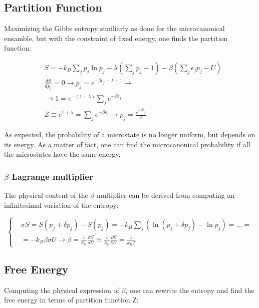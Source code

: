 \documentclass{article}
\begin{document}
\subsection{Partition Function}

Maximizing the Gibbs entropy similiarly as done for the microcanonical ensamble, but with the constraint of fixed energy, one finds the partition function:

\begin{equation}
    \begin{aligned}
         & S= -k_B\sum_{j}p_j\ln{p_j}-\lambda\left(\sum_{j}p_j-1\right)-\beta\left(\sum_{j}\epsilon_jp_j-U\right) \\
         & \frac{dS}{dp_j}=0 \rightarrow p_j=e^{-\beta\epsilon_j-\lambda-1} \rightarrow                           \\
         & \rightarrow 1=e^{-(1+\lambda)}\sum_{j}e^{-\beta\epsilon_j}                                             \\
         & Z\equiv e^{1+\lambda}=\sum_{j}e^{-\beta\epsilon_j} \rightarrow p_j=\frac{e^{-\beta\epsilon_j}}{Z}
    \end{aligned}
\end{equation}

As expected, the probability of a microstate is no longer uniform, but depends on its energy.
As a matter of fact, one can find the microcanonical probability if all the microstates have the same energy.

\subsubsection{$\beta$ Lagrange multiplier}

The physical content of the $\beta$ multiplier can be derived from computing
an infinitesimal variation of the entropy:

\begin{equation}
    \left\{
    \begin{aligned}
         & \sigma S= S(p_j+\delta p_j)-S(p_j) = -k_B\sum_{j}(\ln{(p_j+\delta p_j)}-\ln{p_j})=...=                                                        \\
         & = -k_B\beta\sigma U \rightarrow \beta=\frac{1}{k_B}\frac{\sigma S}{\sigma U}\simeq \frac{1}{k_B}\frac{\partial S}{\partial U}= \frac{1}{k_BT}
    \end{aligned}
    \right.
\end{equation}

\subsection{Free Energy}
Computing the physical expression of $\beta$, one can rewrite the entropy and find the free energy in terms of partition function Z:
\end{document}
